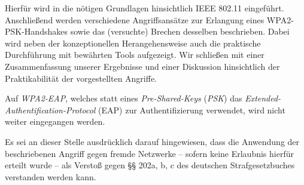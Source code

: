 Hierfür wird in die nötigen Grundlagen hinsichtlich IEEE 802.11 eingeführt.
Anschließend werden verschiedene Angriffsansätze zur Erlangung eines WPA2-PSK-Handshakes sowie das (versuchte) Brechen desselben beschrieben. 
Dabei wird neben der konzeptionellen Herangehensweise auch die praktische Durchführung mit bewährten Tools aufgezeigt. 
Wir schließen mit einer Zusammenfassung unserer Ergebnisse und einer Diskussion hinsichtlich der Praktikabilität der vorgestellten Angriffe.

Auf \textit{WPA2-EAP}, welches statt eines \textit{Pre-Shared-Keys} (\textit{PSK}) das \textit{Extended-Authentification-Protocol} (EAP) zur Authentifizierung verwendet, wird nicht weiter eingegangen werden.

Es sei an dieser Stelle ausdrücklich darauf hingewiesen, dass die Anwendung der beschriebenen Angriff gegen fremde Netzwerke -- sofern keine Erlaubnis hierfür erteilt wurde -- als Verstoß gegen §§ 202a, b, c des deutschen Strafgesetzbuches verstanden werden kann.
